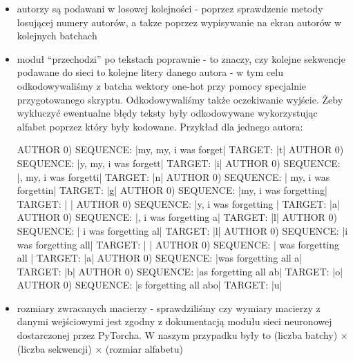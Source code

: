 	\begin{itemize} 
	  \item {autorzy są podawani w losowej kolejności - poprzez sprawdzenie metody losującej numery autorów,
	  a takze poprzez wypisywanie na ekran autorów w kolejnych batchach}
	  \item {moduł ``przechodzi'' po tekstach poprawnie - to znaczy, czy kolejne sekwencje podawane do sieci to 
	  kolejne litery danego autora - w tym celu odkodowywaliśmy z batcha wektory one-hot przy pomocy 
	  specjalnie przygotowanego skryptu. Odkodowywaliśmy także oczekiwanie wyjście. Żeby wykluczyć ewentualne błędy
	  teksty były odkodowywane wykorzystując alfabet poprzez który były kodowane.
	  Przykład dla jednego autora:
\begin{bash}
AUTHOR 0) SEQUENCE: |my, my, i was forget|     TARGET: |t|
AUTHOR 0) SEQUENCE: |y, my, i was forgett|     TARGET: |i|
AUTHOR 0) SEQUENCE: |, my, i was forgetti|     TARGET: |n|
AUTHOR 0) SEQUENCE: | my, i was forgettin|     TARGET: |g|
AUTHOR 0) SEQUENCE: |my, i was forgetting|     TARGET: | |
AUTHOR 0) SEQUENCE: |y, i was forgetting |     TARGET: |a|
AUTHOR 0) SEQUENCE: |, i was forgetting a|     TARGET: |l|
AUTHOR 0) SEQUENCE: | i was forgetting al|     TARGET: |l|
AUTHOR 0) SEQUENCE: |i was forgetting all|     TARGET: | |
AUTHOR 0) SEQUENCE: | was forgetting all |     TARGET: |a|
AUTHOR 0) SEQUENCE: |was forgetting all a|     TARGET: |b|
AUTHOR 0) SEQUENCE: |as forgetting all ab|     TARGET: |o|
AUTHOR 0) SEQUENCE: |s forgetting all abo|     TARGET: |u|
\end{bash} }
	  \item {rozmiary zwracanych macierzy - sprawdziliśmy czy wymiary macierzy z danymi wejściowymi jest zgodny 
	  z dokumentacją modułu sieci neuronowej dostarczonej przez PyTorcha. W naszym przypadku były to 
	  (liczba batchy) $\times$ (liczba sekwencji) $\times$ (rozmiar alfabetu) }
	\end{itemize}

